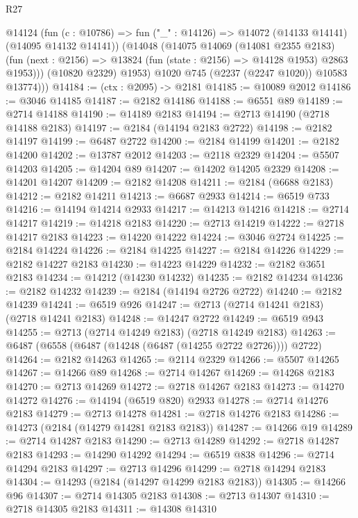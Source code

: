 \begin{lexlean}{R27}
\begin{coremodule}
          @14124
            (fun (c : @10786) =>
            fun ("_" : @14126) => @14072 (@14133 @14141) (@14095 @14132 @14141))
            (@14048
              (@14075
                @14069
                (@14081 @2355 @2183)
                (fun (next : @2156) => @13824 (fun (state : @2156) => @14128 @1953) @2863 @1953)))
            (@10820 @2329)
            @1953)
          @1020
          @745
          (@2237 (@2247 @1020))
          @10583
          @13774)))
@14184 := (ctx : @2095) -> @2181
@14185 := @10089 @2012
@14186 := @3046 @14185
@14187 := @2182 @14186
@14188 := @6551 @89
@14189 := @2714 @14188
@14190 := @14189 @2183
@14194 := @2713 @14190 (@2718 @14188 @2183)
@14197 := @2184 (@14194 @2183 @2722)
@14198 := @2182 @14197
@14199 := @6487 @2722
@14200 := @2184 @14199
@14201 := @2182 @14200
@14202 := @13787 @2012
@14203 := @2118 @2329
@14204 := @5507 @14203
@14205 := @14204 @89
@14207 := @14202 @14205 @2329
@14208 := @14201 @14207
@14209 := @2182 @14208
@14211 := @2184 (@6688 @2183)
@14212 := @2182 @14211
@14213 := @6687 @2933
@14214 := @6519 @733
@14216 := @14194 @14214 @2933
@14217 := @14213 @14216
@14218 := @2714 @14217
@14219 := @14218 @2183
@14220 := @2713 @14219
@14222 := @2718 @14217 @2183
@14223 := @14220 @14222
@14224 := @3046 @2724
@14225 := @2184 @14224
@14226 := @2184 @14225
@14227 := @2184 @14226
@14229 := @2182 @14227 @2183
@14230 := @14223 @14229
@14232 := @2182 @3651 @2183
@14234 := @14212 (@14230 @14232)
@14235 := @2182 @14234
@14236 := @2182 @14232
@14239 := @2184 (@14194 @2726 @2722)
@14240 := @2182 @14239
@14241 := @6519 @926
@14247 := @2713 (@2714 @14241 @2183) (@2718 @14241 @2183)
@14248 := @14247 @2722
@14249 := @6519 @943
@14255 := @2713 (@2714 @14249 @2183) (@2718 @14249 @2183)
@14263 := @6487 (@6558 (@6487 (@14248 (@6487 (@14255 @2722 @2726)))) @2722)
@14264 := @2182 @14263
@14265 := @2114 @2329
@14266 := @5507 @14265
@14267 := @14266 @89
@14268 := @2714 @14267
@14269 := @14268 @2183
@14270 := @2713 @14269
@14272 := @2718 @14267 @2183
@14273 := @14270 @14272
@14276 := @14194 (@6519 @820) @2933
@14278 := @2714 @14276 @2183
@14279 := @2713 @14278
@14281 := @2718 @14276 @2183
@14286 := @14273 (@2184 (@14279 @14281 @2183 @2183))
@14287 := @14266 @19
@14289 := @2714 @14287 @2183
@14290 := @2713 @14289
@14292 := @2718 @14287 @2183
@14293 := @14290 @14292
@14294 := @6519 @838
@14296 := @2714 @14294 @2183
@14297 := @2713 @14296
@14299 := @2718 @14294 @2183
@14304 := @14293 (@2184 (@14297 @14299 @2183 @2183))
@14305 := @14266 @96
@14307 := @2714 @14305 @2183
@14308 := @2713 @14307
@14310 := @2718 @14305 @2183
@14311 := @14308 @14310

\end{coremodule}
\end{lexlean}
